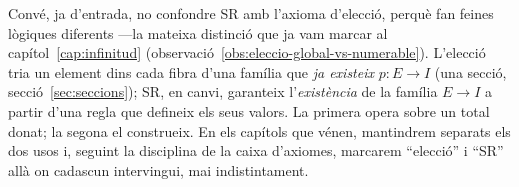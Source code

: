 \begin{observacio}[SR no és l'elecció]\label{obs:sr-no-eleccio}
Convé, ja d'entrada, no confondre SR amb l'axioma d'elecció, perquè fan
feines lògiques diferents ---la mateixa distinció que ja vam marcar al
capítol~\ref{cap:infinitud}
(observació~\ref{obs:eleccio-global-vs-numerable}). L'elecció tria un element
dins cada fibra d'una família que \emph{ja existeix} \(p\colon E\to I\)
(una secció, secció~\ref{sec:seccions}); SR, en canvi, garanteix
l'\emph{existència} de la família \(E\to I\) a partir d'una regla que defineix
els seus valors. La primera opera sobre un total donat; la segona el
construeix. En els capítols que vénen, mantindrem separats els dos usos i,
seguint la disciplina de la caixa d'axiomes, marcarem \enquote{elecció} i
\enquote{SR} allà on cadascun intervingui, mai indistintament.
\end{observacio}

